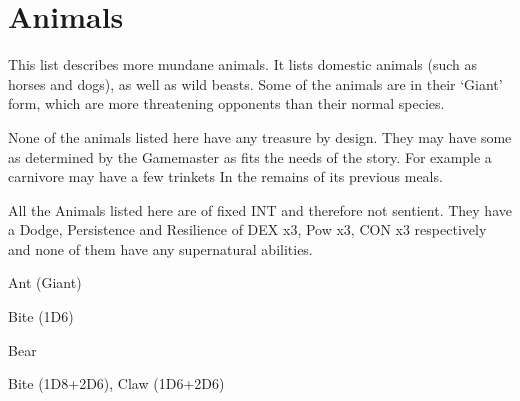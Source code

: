 \clearpage

\section{Animals}

This list describes more mundane animals. It lists domestic animals (such as horses and dogs), as well as wild beasts. Some of the animals are in their ‘Giant’ form, which are more threatening opponents than their normal species.

None of the animals listed here have any treasure by design. They may have some as determined by the Gamemaster as fits the needs of the story. For example a carnivore may have a few trinkets In the remains of its previous meals.

All the Animals listed here are of fixed INT and therefore not sentient. They have a Dodge, Persistence and Resilience of DEX x3, Pow x3, CON x3 respectively and none of them have any supernatural abilities.

\vspace{1em}

\begin{samepage}
\begin{monsterbox}{Ant (Giant)}
	\basics[%
        hitpoints  = 12, 
	majorwound = 6,
	damagemodifier = 0,
	powerpoints = 6,
	movementrate = 15m,
	armor = Chitin (5 AP),
	]
	\rpghline%
	\stats[ %
		STR = 4D6   (14),
		CON = 3D6+6 (17),
		DEX = 2D6+6 (13),
		SIZ = 2D6   (7),
		INT = 2     (2),
		POW = 1D6+3 (6),
		CHA = 5     (5)
	]
	\rpghline%
	\begin{rpg-monsteraction}
		Bite (1D6)
	\end{rpg-monsteraction}
\end{monsterbox}
\end{samepage}


\begin{samepage}
\begin{monsterbox}{Bear}
	\basics[%
        hitpoints  = 19, 
	majorwound = 10,
	damagemodifier = 0,
	powerpoints = 11,
	movementrate = 23m,
	armor = Tough hide (3 AP),
	]
	\rpghline%
	\stats[ %
		STR = 3D6+15 (25),
		CON = 2D6+6  (13),
		DEX = 3D6    (11),
		SIZ = 3D6+15 (25),
		INT = 5     (5),
		POW = 3D6   (11),
		CHA = 5     (5)
	]
	\rpghline%
	\begin{rpg-monsteraction}
		Bite (1D8+2D6), Claw (1D6+2D6)
	\end{rpg-monsteraction}
\end{monsterbox}
\end{samepage}

